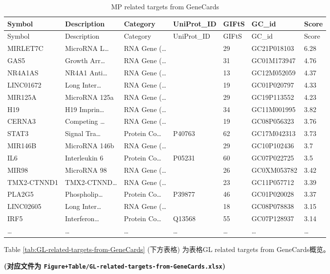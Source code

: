 \documentclass[
]{article}
\begin{document}
\begin{longtable}[]{@{}lllllll@{}}
\caption{\label{tab:MP-related-targets-from-GeneCards}MP related targets from GeneCards}\tabularnewline
\toprule
Symbol & Description & Category & UniProt\_ID & GIFtS & GC\_id & Score\tabularnewline
\midrule
\endfirsthead
\toprule
Symbol & Description & Category & UniProt\_ID & GIFtS & GC\_id & Score\tabularnewline
\midrule
\endhead
MIRLET7C & MicroRNA L\ldots{} & RNA Gene (\ldots{} & & 29 & GC21P018103 & 6.28\tabularnewline
GAS5 & Growth Arr\ldots{} & RNA Gene (\ldots{} & & 31 & GC01M173947 & 4.76\tabularnewline
NR4A1AS & NR4A1 Anti\ldots{} & RNA Gene (\ldots{} & & 13 & GC12M052059 & 4.37\tabularnewline
LINC01672 & Long Inter\ldots{} & RNA Gene (\ldots{} & & 19 & GC01P020797 & 4.33\tabularnewline
MIR125A & MicroRNA 125a & RNA Gene (\ldots{} & & 29 & GC19P113552 & 4.23\tabularnewline
H19 & H19 Imprin\ldots{} & RNA Gene (\ldots{} & & 34 & GC11M001995 & 3.82\tabularnewline
CERNA3 & Competing \ldots{} & RNA Gene (\ldots{} & & 19 & GC08P056323 & 3.76\tabularnewline
STAT3 & Signal Tra\ldots{} & Protein Co\ldots{} & P40763 & 62 & GC17M042313 & 3.73\tabularnewline
MIR146B & MicroRNA 146b & RNA Gene (\ldots{} & & 29 & GC10P102436 & 3.7\tabularnewline
IL6 & Interleukin 6 & Protein Co\ldots{} & P05231 & 60 & GC07P022725 & 3.5\tabularnewline
MIR98 & MicroRNA 98 & RNA Gene (\ldots{} & & 26 & GC0XM053782 & 3.42\tabularnewline
TMX2-CTNND1 & TMX2-CTNND\ldots{} & RNA Gene (\ldots{} & & 23 & GC11P057712 & 3.39\tabularnewline
PLA2G5 & Phospholip\ldots{} & Protein Co\ldots{} & P39877 & 46 & GC01P020028 & 3.37\tabularnewline
LINC02605 & Long Inter\ldots{} & RNA Gene (\ldots{} & & 18 & GC08P078838 & 3.15\tabularnewline
IRF5 & Interferon\ldots{} & Protein Co\ldots{} & Q13568 & 55 & GC07P128937 & 3.14\tabularnewline
\ldots{} & \ldots{} & \ldots{} & \ldots{} & \ldots{} & \ldots{} & \ldots{}\tabularnewline
\bottomrule
\end{longtable}

Table \ref{tab:GL-related-targets-from-GeneCards} (下方表格) 为表格GL related targets from GeneCards概览。

\textbf{(对应文件为 \texttt{Figure+Table/GL-related-targets-from-GeneCards.xlsx})}
\end{document}
